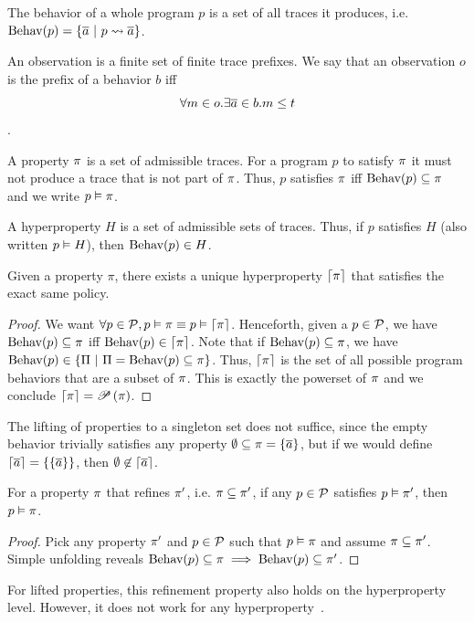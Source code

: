 \begin{definition}[Behavior]
  The behavior of a whole program $p$ is a set of all traces it produces, i.e. $\behav{p}=\{\trace\ |\ \mktrace{p}{\trace}\}$.
\end{definition}

\begin{definition}[Observation]
  An observation is a finite set of finite trace prefixes.
  We say that an observation $o$ is the prefix of a behavior $b$ iff $$\forall m\in o.\exists \overline{a}\in b.m\le t$$.
\end{definition}

\begin{definition}[Properties]
  A property $\pi$ is a set of admissible traces. For a program $p$ to satisfy $\pi$ it must not produce a trace that is not part of $\pi$. Thus, $p$ satisfies $\pi$ iff $\text{Behav}({p})\subseteq\pi$ and we write ${p}\vDash{\pi}$.
\end{definition}

\begin{definition}[Hyperproperties]
  A hyperproperty $H$ is a set of admissible sets of traces. Thus, if $p$ satisfies $H$ (also written ${p}\vDash{H}$), then $\text{Behav}({p})\in H$.
\end{definition}

\begin{lemma}
  Given a property $\pi$, there exists a unique hyperproperty $\left\lceil{\pi}\right\rceil$ that satisfies the exact same policy.
\end{lemma}
\begin{proof}
  We want $\forall p \in\mathcal{P}, {p}\vDash{\pi}\equiv{p}\vDash{\left\lceil{\pi}\right\rceil}$.
  Henceforth, given a $p\in\mathcal{P}$, we have $\text{Behav}({p})\subseteq\pi$ iff $\text{Behav}({p})\in\left\lceil{\pi}\right\rceil$.
  Note that if $\text{Behav}({p})\subseteq\pi$, we have $\behav{p}\in\left\{\Pi\ |\ \Pi=\behav{p}\subseteq\prop\right\}$.
  Thus, $\left\lceil{\pi}\right\rceil$ is the set of all possible program behaviors that are a subset of $\pi$.
  This is exactly the powerset of $\pi$ and we conclude $\left\lceil{\pi}\right\rceil=\mathscr{P}\left({\pi}\right)$.
\end{proof}
\noindent
The lifting of properties to a singleton set does not suffice, since the empty behavior trivially satisfies any property $\emptyset\subseteq\pi=\{\overline{a}\}$, but if we would define $\left\lceil{\overline{a}}\right\rceil=\{\{\overline{a}\}\}$, then $\emptyset\not\in\left\lceil{\overline{a}}\right\rceil$.

\begin{lemma}
  For a property $\pi$ that refines $\pi'$, i.e. $\pi\subseteq\pi'$, if any $p\in\mathcal{P}$ satisfies ${p}\vDash{\pi'}$, then ${p}\vDash{\pi}$.
\end{lemma}
\begin{proof}
  Pick any property $\pi'$ and $p\in\mathcal{P}$ such that ${p}\vDash{\pi}$ and assume $\pi\subseteq\pi'$.
  Simple unfolding reveals $\text{Behav}({p})\subseteq\pi\implies\text{Behav}({p})\subseteq\pi'$.
\end{proof}
\noindent
For lifted properties, this refinement property also holds on the hyperproperty level.
However, it does not work for any hyperproperty~\cite{clarkson08}.

